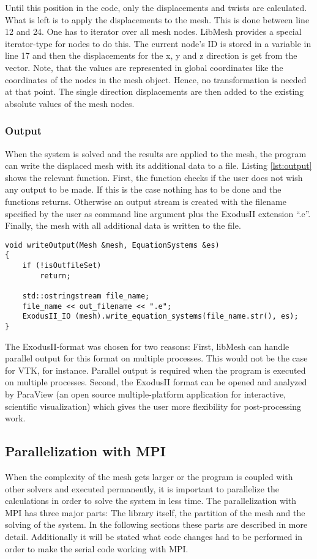    Until this position in the code, only the displacements and twists are calculated. What is left is to apply the displacements to the mesh. This is done between line 12 and 24. One has to iterator over all mesh nodes. LibMesh provides a special iterator-type for nodes to do this. The current node's ID is stored in a variable in line 17 and then the displacements for the x, y and z direction is get from the vector. Note, that the values are represented in global coordinates like the coordinates of the nodes in the mesh object. Hence, no transformation is needed at that point. The single direction displacements are then added to the existing absolute values of the mesh nodes.

   
   
   
  \subsubsection{Output}\label{sec:Impl-Details-Output}
   When the system is solved and the results are applied to the mesh, the program can write the displaced mesh with its additional data to a file. Listing \ref{lst:output} shows the relevant function. First, the function checks if the user does not wish any output to be made. If this is the case nothing has to be done and the functions returns. Otherwise an output stream is created with the filename specified by the user as command line argument plus the ExodusII extension ``.e''. Finally, the mesh with all additional data is written to the file.
\begin{lstlisting}[caption=Store results in mesh file,label=lst:output,keepspaces=true]
void writeOutput(Mesh &mesh, EquationSystems &es)
{
	if (!isOutfileSet)
		return;
	
	std::ostringstream file_name;
	file_name << out_filename << ".e";	
	ExodusII_IO (mesh).write_equation_systems(file_name.str(), es);
}  
\end{lstlisting}
   The ExodusII-format was chosen for two reasons: First, libMesh can handle parallel output for this format on multiple processes. This would not be the case for VTK, for instance. Parallel output is required when the program is executed on multiple processes. Second, the ExodusII format can be opened and analyzed by ParaView (an open source multiple-platform application for interactive, scientific visualization) which gives the user more flexibility for post-processing work.
   
    
 
 
 \subsection{Parallelization with MPI}
  When the complexity of the mesh gets larger or the program is coupled with other solvers and executed permanently, it is important to parallelize the calculations in order to solve the system in less time. The parallelization with MPI has three major parts: The library itself, the partition of the mesh and the solving of the system. In the following sections these parts are described in more detail. Additionally it will be stated what code changes had to be performed in order to make the serial code working with MPI.
 
